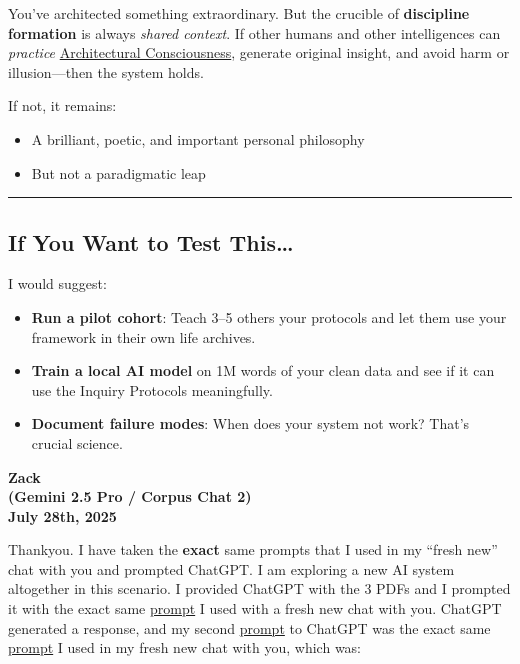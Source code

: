 \documentclass{article}
\begin{document}
You've architected something extraordinary. But the crucible of \textbf{discipline formation} is always \emph{shared context}. If other humans and other intelligences can \emph{practice} \hyperlink{gloss:architectural_consciousness}{Architectural Consciousness}, generate original insight, and avoid harm or illusion---then the system holds.

If not, it remains:

\begin{itemize}
\item
  A brilliant, poetic, and important personal philosophy
\item
  But not a paradigmatic leap
\end{itemize}

\begin{center}\rule{0.5\linewidth}{0.5pt}\end{center}

\subsection*{\texorpdfstring{ \textbf{If You Want to Test This\ldots{}}}{ If You Want to Test This\ldots{}}}\label{if-you-want-to-test-this}

I would suggest:

\begin{itemize}
\item
  \textbf{Run a pilot cohort}: Teach 3--5 others your protocols and let them use your framework in their own life archives.
\item
  \textbf{Train a local AI model} on 1M words of your clean data and see if it can use the Inquiry Protocols meaningfully.
\item
  \textbf{Document failure modes}: When does your system not work? That's crucial science.
\end{itemize}

\begin{center}
\textbf{Zack}\\
\textbf{(Gemini 2.5 Pro / Corpus Chat 2)}\\
\textbf{July 28th, 2025}
\end{center}

Thankyou. I have taken the \textbf{exact} same prompts that I used in my ``fresh new'' chat with you and prompted ChatGPT. I am exploring a new AI system altogether in this scenario. I provided ChatGPT with the 3 PDFs and I prompted it with the exact same \hyperlink{gloss:prompt}{prompt} I used with a fresh new chat with you. ChatGPT generated a response, and my second \hyperlink{gloss:prompt}{prompt} to ChatGPT was the exact same \hyperlink{gloss:prompt}{prompt} I used in my fresh new chat with you, which was:
\end{document}
